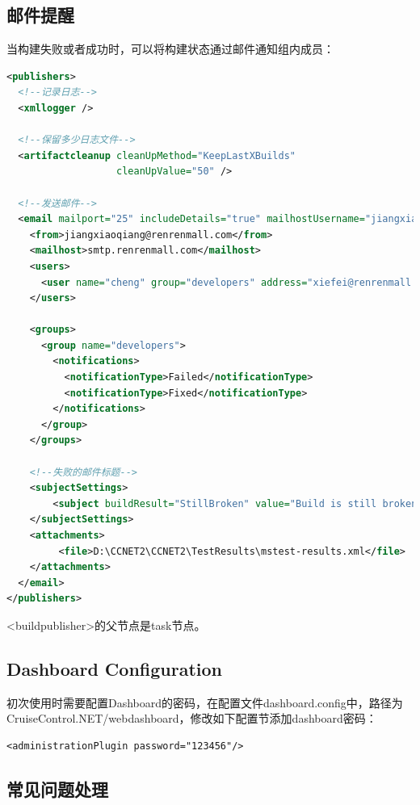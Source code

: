 \documentclass{book}
\begin{document}
\subsection{邮件提醒}

当构建失败或者成功时，可以将构建状态通过邮件通知组内成员：

\begin{lstlisting}[language=XML]
<publishers>  
  <!--记录日志-->  
  <xmllogger />  
    
  <!--保留多少日志文件-->  
  <artifactcleanup cleanUpMethod="KeepLastXBuilds"  
                   cleanUpValue="50" />  
    
  <!--发送邮件-->  
  <email mailport="25" includeDetails="true" mailhostUsername="jiangxiaoqiang@renrenmall.com" mailhostPassword="123456" useSSL="FALSE">  
    <from>jiangxiaoqiang@renrenmall.com</from>  
    <mailhost>smtp.renrenmall.com</mailhost>  
    <users>  
      <user name="cheng" group="developers" address="xiefei@renrenmall.com" />  
    </users>  

    <groups>  
      <group name="developers">  
        <notifications>  
          <notificationType>Failed</notificationType>  
          <notificationType>Fixed</notificationType>  
        </notifications>  
      </group>
    </groups> 

    <!--失败的邮件标题-->  
    <subjectSettings>  
        <subject buildResult="StillBroken" value="Build is still broken for {CCNetProject}" />  
    </subjectSettings>  
    <attachments>  
         <file>D:\CCNET2\CCNET2\TestResults\mstest-results.xml</file>  
    </attachments>
  </email>  
</publishers>
\end{lstlisting}

<buildpublisher>的父节点是task节点。

\subsection{Dashboard Configuration}

初次使用时需要配置Dashboard的密码，在配置文件dashboard.config中，路径为CruiseControl.NET/webdashboard，修改如下配置节添加dashboard密码：
\begin{lstlisting}
<administrationPlugin password="123456"/>
\end{lstlisting}

\subsection{常见问题处理}
\end{document}
